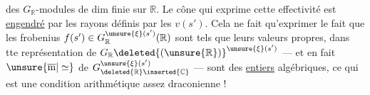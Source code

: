 des $G_{\mathbb R}$-modules de dim finie sur $\mathbb R$. Le cône
qui exprime cette effectivité est \uline{engendré}
par les  rayons définis par les $v(s')$.
Cela ne fait qu'exprimer  le fait que les
frobenius $f(s')\in G_{\mathbb R}^{\unsure{\xi}(s')}(\mathbb R)$ sont tels
que leurs valeurs propres, dans tte représentation
de $G_{\mathbb R}\deleted{(\unsure{\mathbb R})}^{\unsure{\xi}(s')}$ --- et en fait $\unsure{\overline{\mathrm m}|\simeq}$ de
$G_{\deleted{\mathbb R}\inserted{\mathbb C}}^{\unsure{\xi}(s')}$ --- sont des \uline{entiers} algébriques, ce qui est une
condition arithmétique assez draconienne !
